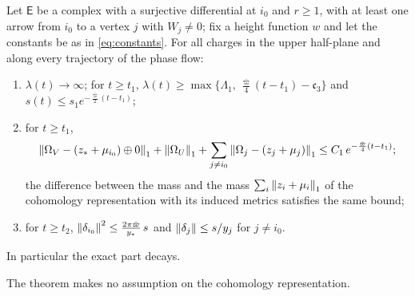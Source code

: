 \begin{theorem}\label{thm:decay}
Let $\mathsf E$ be a complex with a surjective differential at $i_0$ and
$r\geq1$, with at least one arrow from $i_0$ to a vertex $j$ with
$W_j\neq0$; fix a height function $w$ and let the constants be as in
\eqref{eq:constants}. For all
charges in the upper half-plane and along every trajectory of the phase flow:
\begin{enumerate}
\item[(i)] $\lambda(t)\to\infty$; for $t\geq t_1$, $\lambda(t)\geq
 \max\{\Lambda_1,\ \frac{\bar\varpi}4(t-t_1)-\mathfrak c_3\}$ and
 $s(t)\leq s_1e^{-\frac{\bar\varpi}2(t-t_1)}$;
\item[(ii)] for $t\geq t_1$,
 \[
 \left\lVert\Omega_V-(z_\ast+\mu_{i_0})\oplus0\right\rVert_1+\left\lVert\Omega_U\right\rVert_1
 +\sum_{j\neq i_0}\left\lVert\Omega_j-(z_j+\mu_j)\right\rVert_1
 \leq C_1\,e^{-\frac{\bar\varpi}4(t-t_1)};
 \]
 the difference between the mass and the mass $\sum_i\left\lVert z_i+\mu_i\right\rVert_1$ of
 the cohomology representation with its induced metrics satisfies the same
 bound;
\item[(iii)] for $t\geq t_2$,
 $\left\lVert\delta_{i_0}\right\rVert^2\leq\frac{2\pi\bar\varpi}{y_\ast}\,s$ and
 $\left\lVert\delta_j\right\rVert\leq s/y_j$ for $j\neq i_0$.
\end{enumerate}
In particular the exact part decays.
\end{theorem}

The theorem makes no assumption on the cohomology representation.

